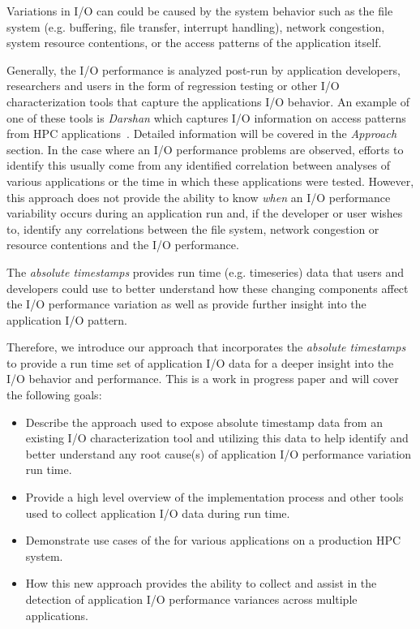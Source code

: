 \documentclass[conference]{IEEEtran}
\begin{document}
Variations in I/O can could be caused by the system behavior such as the file system (e.g. buffering, file transfer, interrupt handling), network congestion, system resource contentions, or the access patterns of the application itself.

Generally, the I/O performance is analyzed post-run by application developers, researchers and users in the form of regression testing or other I/O characterization tools that capture the applications I/O behavior. An example of one of these tools is \emph{Darshan} which captures I/O information on access patterns from HPC applications~\cite{Darshan}. Detailed information will be covered in the \emph{Approach} section. In the case where an I/O performance problems are observed, efforts to identify this usually come from any identified correlation between analyses of various applications or the time in which these applications were tested. However, this approach does not provide the ability to know \emph{when} an I/O performance variability occurs during an application run and, if the developer or user wishes to, identify any correlations between the file system, network congestion or resource contentions and the I/O performance.


The \emph{absolute timestamps} provides run time (e.g. timeseries) data that users and developers could use to better understand how these changing components affect the I/O performance variation as well as provide further insight into the application I/O pattern.

Therefore, we introduce our \Darshan approach that incorporates the \emph{absolute timestamps} to provide a run time set of application I/O data for a deeper insight into the I/O behavior and performance. This is a work in progress paper and will cover the following goals:
\begin{itemize}
    \item Describe the approach used to expose absolute timestamp data from an existing I/O characterization tool and utilizing this data to help identify and better understand any root cause(s) of application I/O performance variation run time.
    \item Provide a high level overview of the implementation process and other tools used to collect application I/O data during run time.
    \item Demonstrate use cases of the \connector for various applications on a production HPC system. 
    \item How this new approach provides the ability to collect and assist in the detection of application I/O performance variances across multiple applications. 
\end{itemize}
\end{document}
